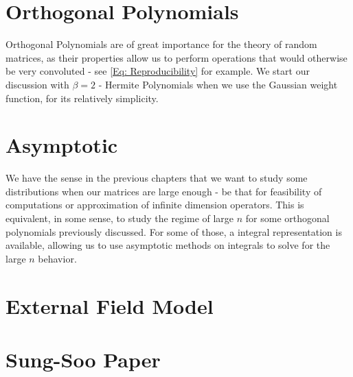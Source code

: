 \documentclass[]{report}
\numberwithin{equation}{section} %
\begin{document}




\chapter{Orthogonal Polynomials}

Orthogonal Polynomials are of great importance for the theory of random matrices, as their properties allow us to perform operations that would otherwise be very convoluted - see \eqref{Eq: Reproducibility} for example. We start our discussion with $\beta = 2$ - Hermite Polynomials when we use the Gaussian weight function, for its relatively simplicity.



\chapter{Asymptotic}

We have the sense in the previous chapters that we want to study some distributions when our matrices are large enough - be that for feasibility of computations or approximation of infinite dimension operators. This is equivalent, in some sense, to study the regime of large $n$ for some orthogonal polynomials previously discussed. For some of those, a integral representation is available, allowing us to use asymptotic methods on integrals to solve for the large $n$ behavior.















\chapter{External Field Model}



\chapter{Sung-Soo Paper}
\end{document}
